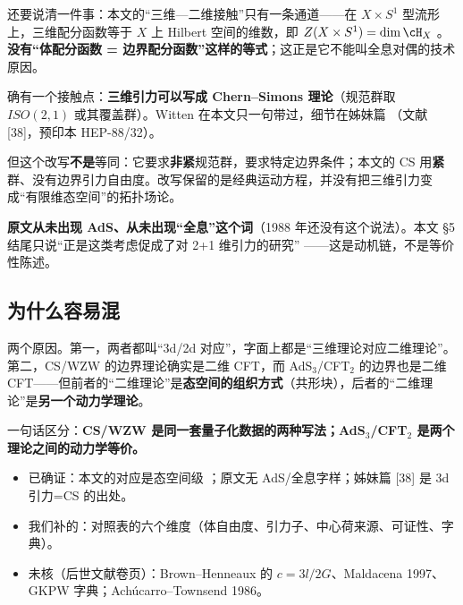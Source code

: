 还要说清一件事：本文的“三维—二维接触”只有一条通道——在 $X\times S^1$ 型流形上，三维配分函数等于 $X$ 上 Hilbert 空间的维数，即 $Z(X\times S^1)=\dim\cH_X$ 。\textbf{没有“体配分函数 = 边界配分函数”这样的等式}；这正是它不能叫全息对偶的技术原因。

确有一个接触点：\textbf{三维引力可以写成 Chern--Simons 理论}（规范群取 $ISO(2,1)$ 或其覆盖群）。Witten 在本文只一句带过，细节在姊妹篇 （文献 [38]，预印本 HEP-88/32）。

但这个改写\textbf{不是}等同：它要求\textbf{非紧}规范群，要求特定边界条件；本文的 CS 用\textbf{紧}群、没有边界引力自由度。改写保留的是经典运动方程，并没有把三维引力变成“有限维态空间”的拓扑场论。

\begin{keypoint}
\textbf{原文从未出现 AdS、从未出现“全息”这个词}（1988 年还没有这个说法）。本文 §5 结尾只说“正是这类考虑促成了对 2+1 维引力的研究” ——这是动机链，不是等价性陈述。
\end{keypoint}

\subsection{为什么容易混}

两个原因。第一，两者都叫“3d/2d 对应”，字面上都是“三维理论对应二维理论”。第二，CS/WZW 的边界理论确实是二维 CFT，而 AdS$_3$/CFT$_2$ 的边界也是二维 CFT——但前者的“二维理论”是\textbf{态空间的组织方式}（共形块），后者的“二维理论”是\textbf{另一个动力学理论}。

一句话区分：\textbf{CS/WZW 是同一套量子化数据的两种写法；AdS$_3$/CFT$_2$ 是两个理论之间的动力学等价。}

\begin{boundary}
\begin{itemize}[leftmargin=1.4em]
\item 已确证：本文的对应是态空间级 ；原文无 AdS/全息字样；姊妹篇 [38] 是 3d 引力=CS 的出处。
\item 我们补的：对照表的六个维度（体自由度、引力子、中心荷来源、可证性、字典）。
\item 未核（后世文献卷页）：Brown--Henneaux 的 $c=3l/2G$、Maldacena 1997、GKPW 字典；Achúcarro--Townsend 1986。
\end{itemize}
\end{boundary}
